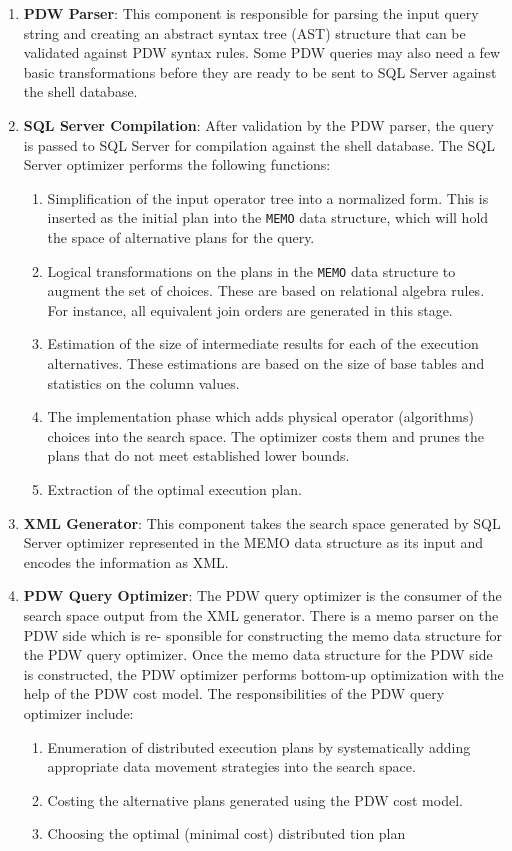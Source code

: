 \documentclass[11pt]{article}
\begin{document}
\begin{enumerate}
\item \textbf{PDW Parser}: This component is responsible for parsing the input query string and creating an
abstract syntax tree (AST) structure that can be validated against PDW syntax rules. Some PDW
queries may also need a few basic transformations before they are ready to be sent to SQL Server
against the shell database.
\item \textbf{SQL Server Compilation}: After validation by the PDW parser, the query is passed to SQL Server for
compilation against the shell database. The SQL Server optimizer performs the following functions:
\begin{enumerate}
\item Simplification of the input operator tree into a normalized form. This is inserted as the
initial plan into the \texttt{MEMO} data structure, which will hold the space of alternative plans for the query.
\item Logical transformations on the plans in the \texttt{MEMO} data structure to augment the set of choices.
These are based on relational algebra rules. For instance, all equivalent join orders are
generated in this stage.
\item Estimation of the size of intermediate results for each of the execution alternatives. These
estimations are based on the size of base tables and statistics on the column values.
\item The implementation phase which adds physical operator (algorithms) choices into the search
space. The optimizer costs them and prunes the plans that do not meet established lower bounds.
\item Extraction of the optimal execution plan.
\end{enumerate}
\item \textbf{XML Generator}: This component takes the search space generated by SQL Server optimizer represented
in the MEMO data structure as its input and encodes the information as XML.
\item \textbf{PDW Query Optimizer}: The PDW query optimizer is the consumer of the search space output from the
XML generator. There is a memo parser on the PDW side which is re- sponsible for constructing the
memo data structure for the PDW query optimizer. Once the memo data structure for the PDW side is
constructed, the PDW optimizer performs bottom-up optimization with the help of the PDW cost model.
The responsibilities of the PDW query optimizer include:
\begin{enumerate}
\item Enumeration of distributed execution plans by systematically adding appropriate data movement
strategies into the search space.
\item Costing the alternative plans generated using the PDW cost model.
\item Choosing the optimal (minimal cost) distributed tion plan
\end{enumerate}
\end{enumerate}
\end{document}
